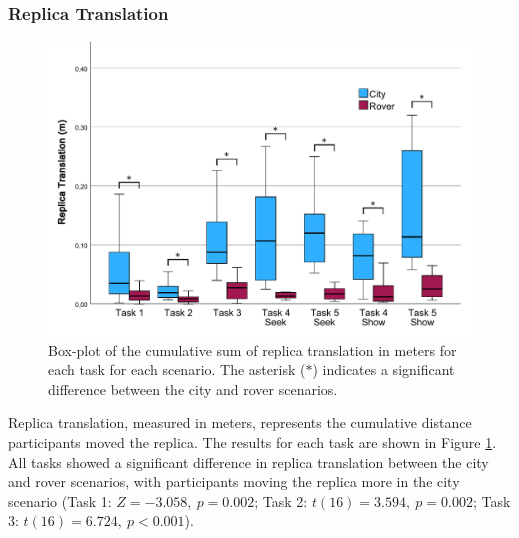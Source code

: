         \subsubsection{Replica Translation}

            
            \begin{figure}[h!]
                \centering
                \includegraphics[width=1\linewidth]{figures/replica_translation_graph.pdf}
                \caption{Box-plot of the cumulative sum of replica translation in meters for each task for each scenario. The asterisk ($\ast$) indicates a significant difference between the city and rover scenarios.}
                \label{fig:task_replica_translation}
            \end{figure}

            Replica translation, measured in meters, represents the cumulative distance participants moved the replica. The results for each task are shown in Figure \ref{fig:task_replica_translation}. All tasks showed a significant difference in replica translation between the city and rover scenarios, with participants moving the replica more in the city scenario (Task 1: $Z = -3.058,\ p = 0.002$; Task 2: $t(16) = 3.594,\ p = 0.002$; Task 3: $t(16) = 6.724,\ p < 0.001$).

